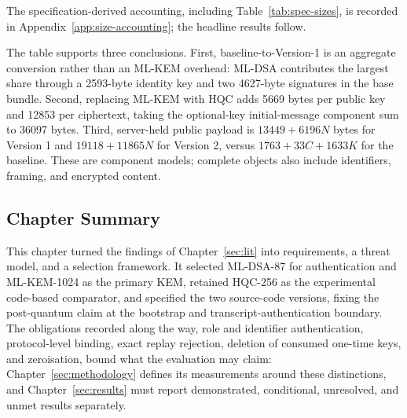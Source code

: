 The specification-derived accounting, including Table~\ref{tab:spec-sizes}, is recorded in Appendix~\ref{app:size-accounting}; the headline results follow.

The table supports three conclusions. First, baseline-to-Version-1 is an aggregate conversion rather than an ML-KEM overhead: ML-DSA contributes the largest share through a 2593-byte identity key and two 4627-byte signatures in the base bundle. Second, replacing ML-KEM with HQC adds 5669 bytes per public key and 12853 per ciphertext, taking the optional-key initial-message component sum to 36097 bytes. Third, server-held public payload is \(13449+6196N\) bytes for Version 1 and \(19118+11865N\) for Version 2, versus \(1763+33C+1633K\) for the baseline. These are component models; complete objects also include identifiers, framing, and encrypted content.

\subsection{Chapter Summary}
\label{subsec:design-summary}

This chapter turned the findings of Chapter~\ref{sec:lit} into requirements, a threat model, and a selection framework. It selected ML-DSA-87 for authentication and ML-KEM-1024 as the primary KEM, retained HQC-256 as the experimental code-based comparator, and specified the two source-code versions, fixing the post-quantum claim at the bootstrap and transcript-authentication boundary. The obligations recorded along the way, role and identifier authentication, protocol-level binding, exact replay rejection, deletion of consumed one-time keys, and zeroisation, bound what the evaluation may claim: Chapter~\ref{sec:methodology} defines its measurements around these distinctions, and Chapter~\ref{sec:results} must report demonstrated, conditional, unresolved, and unmet results separately.
